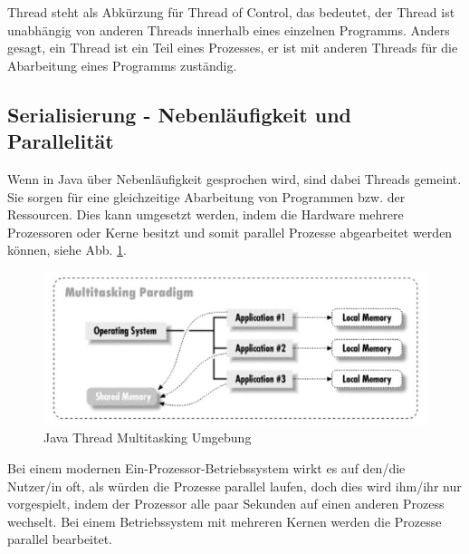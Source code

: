 
Thread steht als Abkürzung für Thread of Control, das bedeutet, der Thread ist unabhängig von anderen Threads innerhalb eines einzelnen Programms. Anders gesagt, ein Thread ist ein Teil eines Prozesses, er ist mit anderen Threads für die Abarbeitung eines Programms zuständig.  \cite{JavaThreadsBuch}
 
 
\subsection{Serialisierung - Nebenläufigkeit und Parallelität}
Wenn in Java über Nebenläufigkeit gesprochen wird, sind dabei Threads gemeint. Sie sorgen für eine gleichzeitige Abarbeitung von Programmen bzw. der Ressourcen. Dies kann umgesetzt werden, indem die Hardware mehrere Prozessoren oder Kerne besitzt und somit parallel Prozesse abgearbeitet werden können, siehe Abb. \ref{fig:impl:javaThreadMultitasking}.

\begin{figure}[h t]
    \centering
    \includegraphics[scale=1]{pics/javaThreadMultitasking.jpg}
    \caption{Java Thread Multitasking Umgebung \cite{JavaThreadsBuch}}
    \label{fig:impl:javaThreadMultitasking}
\end{figure}

Bei einem modernen Ein-Prozessor-Betriebssystem wirkt es auf den/die Nutzer/in oft, als würden die Prozesse parallel laufen, doch dies wird ihm/ihr nur vorgespielt, indem der Prozessor alle paar Sekunden auf einen anderen Prozess wechselt. Bei einem Betriebssystem mit mehreren Kernen werden die Prozesse parallel bearbeitet. \cite{javaInselBuch}

